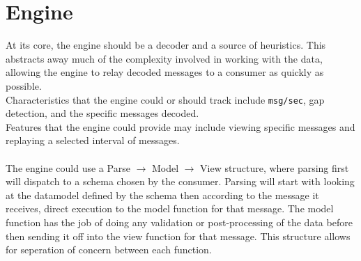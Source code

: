 \section{Engine}

At its core, the engine should be a decoder and a source of heuristics. This
abstracts away much of the complexity involved in working with the data,
allowing the engine to relay decoded messages to a consumer as quickly as
possible.\\ Characteristics that the engine could or should track include
\texttt{msg/sec}, gap detection, and the specific messages decoded.\\ Features
that the engine could provide may include viewing specific messages and
replaying a selected interval of messages.\\ \vspace{5em}\\ The engine could
use a Parse $\rightarrow$ Model $\rightarrow$ View structure, where parsing
first will dispatch to a schema chosen by the consumer. Parsing will start with
looking at the datamodel defined by the schema then according to the message it
receives, direct execution to the model function for that message. The model
function has the job of doing any validation or post-processing of the data
before then sending it off into the view function for that message. This
structure allows for seperation of concern between each function.

